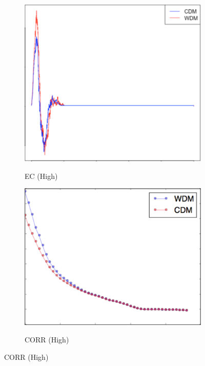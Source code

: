 \documentclass[12pt]{article}
\begin{document}
\begin{figure}[htp!]
  \centering
    \begin{subfigure}{0.21\textwidth}
    \centering
        \caption{EC (High)}
\includegraphics[width=\linewidth]{valid1.pdf}
    \label{fig:valid1}
  \end{subfigure}
    \begin{subfigure}{0.24\textwidth}
    \centering
        \caption{CORR (High)}
\includegraphics[width=\linewidth]{valid2.pdf}
    \label{fig:valid2}
  \end{subfigure}

\end{figure}
\end{document}
